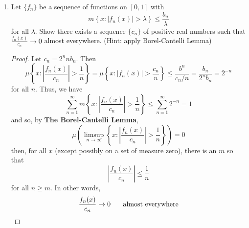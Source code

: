 \documentclass[12pt,leqno]{article}
\numberwithin{equation}{section}
\theoremstyle{definition}
\begin{document}
\begin{enumerate}
\begin{proof}[Solution]
 In order to construct the Cantor set, we remove the middle interval of $C_0=[0,1]$ of length $\frac{1}{3}$, and so we have $C_1=[0,\frac{1}{3}]\cup[\frac{2}{3},1]$. From what remains, we remove the middle intervals of length $\frac{1}{9}$, and we have $C_2=[0,\frac{1}{9}]\cup[\frac{2}{9},\frac{1}{3}]\cup[\frac{2}{3},\frac{7}{9}]\cup[\frac{8}{9},1]$. Repeating this process, we define \[\mathfrak{C}=\bigcap_{k=0}^{\infty}C_k\] The total length of the intervals \textit{removed} for $C_k$ is given by $\frac{1}{3}\left(\frac{2}{3}\right)^k$, and so \[\mu(\mathfrak{C})=1-\frac{1}{3}\sum_{k=0}^{\infty}\left(\frac{2}{3}\right)^k=0\] We generalize this construction to form a Cantor-like set of measure $\lambda$ for $\lambda\in(0,1)$ as follows:

Let $u=1-\lambda$. Remove the middle interval of $C_0=[0,1]$ of length $\frac{u}{3}$, call the remaining set $C_1$. Remove the middle intervals of $C_1$ of length $\frac{u}{9}$, call the remaining set $C_2$, and so on. Observe that the total length of the intervals removed for $C_k$ is given by $\frac{u}{3}\left(\frac{1}{3}\right)^k$. Letting \[\mathfrak{C}_{\lambda}=\bigcap_{k=0}^{\infty}C_k\] we see that \begin{align*}\mu(\mathfrak{C}_{\lambda})&=1-\frac{u}{3}\sum_{k=0}^{\infty}\left(\frac{2}{3}\right)^k\\&=1-\frac{u}{3}\left(\frac{1}{1-\frac{2}{3}}\right)\\&=1-u\\&=\lambda\qedhere\end{align*}
\end{proof}

\item Let $\{f_n\}$ be a sequence of functions on $[0,1]$ with \[m\left\{x:|f_n(x)|>\lambda\right\}\leq\frac{b_n}{\lambda}\] for all $\lambda$. Show there exists a sequence $\{c_n\}$ of positive real numbers such that $\frac{f_n(x)}{c_n}\to0$ almost everywhere. (Hint: apply Borel-Cantelli Lemma)

\begin{proof}
 Let $c_n=2^nnb_n$. Then \[\mu\left\{x:\left|\frac{f_n(x)}{c_n}\right|>\frac{1}{n}\right\}=\mu\left\{x:|f_n(x)|>\frac{c_n}{n}\right\}\leq\frac{b^n}{c_n/n}=\frac{b_n}{2^nb_n}=2^{-n}\] for all $n$. Thus, we have \[\sum_{n=1}^{\infty}m\left\{x:\left|\frac{f_n(x)}{c_n}\right|>\frac{1}{n}\right\}\leq\sum_{n=1}^{\infty}2^{-n}=1\] and so, by \textbf{The Borel-Cantelli Lemma}, \[\mu\left(\limsup_{n\to\infty}\left\{x:\left|\frac{f_n(x)}{c_n}\right|>\frac{1}{n}\right\}\right)=0\] then, for all $x$ (except possibly on a set of measure zero), there is an $m$ so that \[\left|\frac{f_n(x)}{c_n}\right|\leq\frac{1}{n}\] for all $n\geq m$. In other words, \[\frac{f_n(x)}{c_n}\to0\hskip.25in\text{almost everywhere}\qedhere\]
\end{proof}


\end{enumerate}
\end{document}

